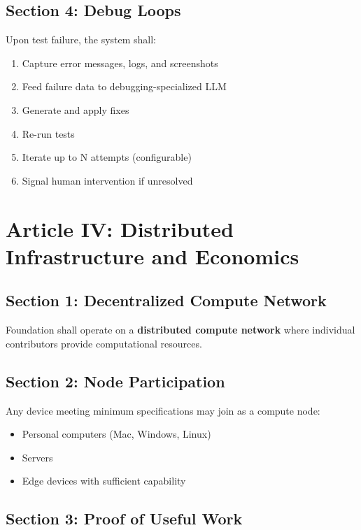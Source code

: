\documentclass[12pt,letterpaper]{article}
\begin{document}
\subsection{Section 4: Debug Loops}

Upon test failure, the system shall:

\begin{enumerate}
    \item Capture error messages, logs, and screenshots
    \item Feed failure data to debugging-specialized LLM
    \item Generate and apply fixes
    \item Re-run tests
    \item Iterate up to N attempts (configurable)
    \item Signal human intervention if unresolved
\end{enumerate}

\section[Article IV]{Article IV: Distributed Infrastructure and Economics}

\subsection{Section 1: Decentralized Compute Network}

Foundation shall operate on a \textbf{distributed compute network} where individual contributors provide computational resources.

\subsection{Section 2: Node Participation}

Any device meeting minimum specifications may join as a compute node:

\begin{itemize}
    \item Personal computers (Mac, Windows, Linux)
    \item Servers
    \item Edge devices with sufficient capability
\end{itemize}

\subsection{Section 3: Proof of Useful Work}
\end{document}
